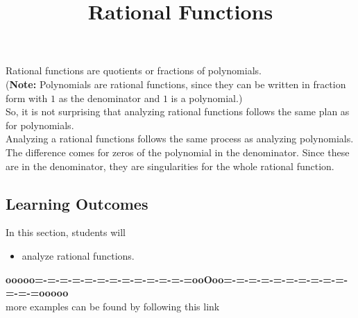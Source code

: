 \documentclass{ximera}
\title{Rational Functions}
\begin{document}
\begin{abstract}
\end{abstract}
\maketitle












Rational functions are quotients or fractions of polynomials.  \\


(\textbf{Note:} Polynomials are rational functions, since they can be written in fraction form with $1$ as the denominator and $1$ is a polynomial.)  \\


So, it is not surprising that analyzing rational functions follows the same plan as for polynomials. \\


Analyzing a rational functions follows the same process as analyzing polynomials.  The difference comes for zeros of the polynomial in the denominator.  Since these are in the denominator, they are singularities for the whole rational function.























\subsection{Learning Outcomes}


\begin{sectionOutcomes}
In this section, students will 

\begin{itemize}
\item analyze rational functions.
\end{itemize}
\end{sectionOutcomes}











\begin{center}
\textbf{\textcolor{green!50!black}{ooooo=-=-=-=-=-=-=-=-=-=-=-=-=ooOoo=-=-=-=-=-=-=-=-=-=-=-=-=ooooo}} \\

more examples can be found by following this link\\ 

\end{center}
\end{document}
